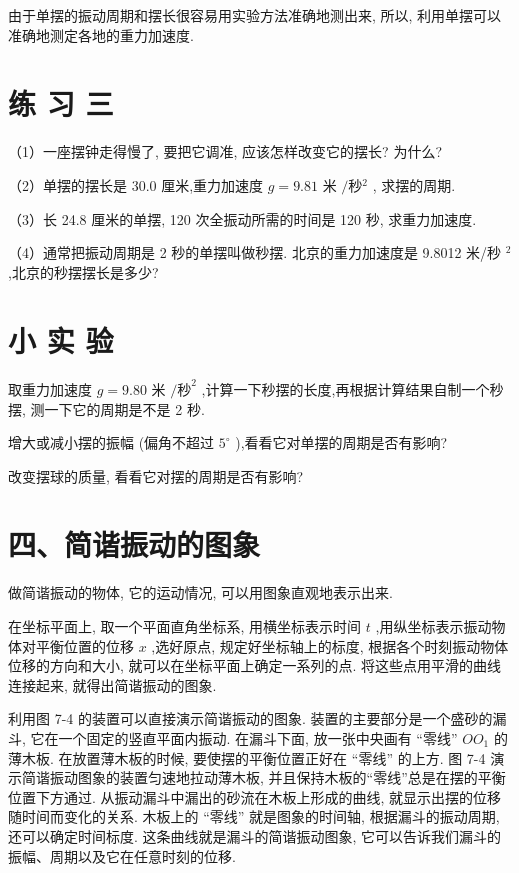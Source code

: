 \documentclass[10pt]{article}
\begin{document}
由于单摆的振动周期和摆长很容易用实验方法准确地测出来, 所以, 利用单摆可以准确地测定各地的重力加速度.

\section*{练 习 三}

（1）一座摆钟走得慢了, 要把它调准, 应该怎样改变它的摆长? 为什么?

（2）单摆的摆长是 30.0 厘米,重力加速度 \(g = {9.81}\) 米 \(/秒{}^{2}\) , 求摆的周期.

（3）长 24.8 厘米的单摆, 120 次全振动所需的时间是 120 秒, 求重力加速度.

（4）通常把振动周期是 2 秒的单摆叫做秒摆. 北京的重力加速度是 9.8012 米/秒 \({}^{2}\) ,北京的秒摆摆长是多少?

\section*{小 实 验}

取重力加速度 \(g = {9.80}\) 米 \(/{\text{秒}}^{2}\) ,计算一下秒摆的长度,再根据计算结果自制一个秒摆, 测一下它的周期是不是 2 秒.

增大或减小摆的振幅 (偏角不超过 \({5}^{ \circ }\) ),看看它对单摆的周期是否有影响?

改变摆球的质量, 看看它对摆的周期是否有影响?

\section*{四、简谐振动的图象}

做简谐振动的物体, 它的运动情况, 可以用图象直观地表示出来.

在坐标平面上, 取一个平面直角坐标系, 用横坐标表示时间 \(t\) ,用纵坐标表示振动物体对平衡位置的位移 \(x\) ,选好原点, 规定好坐标轴上的标度, 根据各个时刻振动物体位移的方向和大小, 就可以在坐标平面上确定一系列的点. 将这些点用平滑的曲线连接起来, 就得出简谐振动的图象.

利用图 7-4 的装置可以直接演示简谐振动的图象. 装置的主要部分是一个盛砂的漏斗, 它在一个固定的竖直平面内振动. 在漏斗下面, 放一张中央画有 “零线” \(O{O}_{1}\) 的薄木板. 在放置薄木板的时候, 要使摆的平衡位置正好在 “零线” 的上方. 图 7-4 演示简谐振动图象的装置匀速地拉动薄木板, 并且保持木板的“零线”总是在摆的平衡位置下方通过. 从振动漏斗中漏出的砂流在木板上形成的曲线, 就显示出摆的位移随时间而变化的关系. 木板上的 “零线” 就是图象的时间轴, 根据漏斗的振动周期, 还可以确定时间标度. 这条曲线就是漏斗的简谐振动图象, 它可以告诉我们漏斗的振幅、周期以及它在任意时刻的位移.
\end{document}
